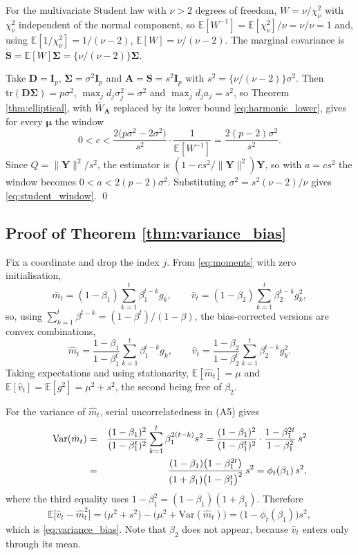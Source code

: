 \documentclass[a4paper,fleqn]{cas-dc}
\theoremstyle{plain}
\theoremstyle{definition}
\theoremstyle{remark}
\newcommand{\rev}[1]{#1}
\newcommand{\tr}{\mathrm{tr}}
\newcommand{\Var}{\mathrm{Var}}
\newcommand{\E}{\mathbb{E}}
\begin{document}
\begin{appendices}
For the multivariate Student law with $\nu>2$ degrees of freedom, $W=\nu/\chi^2_\nu$ with $\chi^2_\nu$ independent of the normal component, so $\E[W^{-1}]=\E[\chi^2_\nu]/\nu=\nu/\nu=1$ and, using $\E[1/\chi^2_\nu]=1/(\nu-2)$, $\E[W]=\nu/(\nu-2)$. The marginal covariance is $\bm S=\E[W]\bm\Sigma=\{\nu/(\nu-2)\}\bm\Sigma$.

Take $\bm D=\bm I_p$, $\bm\Sigma=\sigma^2\bm I_p$ and $\bm A=\bm S=s^2\bm I_p$ with $s^2=\{\nu/(\nu-2)\}\sigma^2$. Then $\tr(\bm D\bm\Sigma)=p\sigma^2$, $\max_jd_j\sigma^2_j=\sigma^2$ and $\max_jd_ja_j=s^2$, so \rev{Theorem \ref{thm:elliptical}, with $\bar W_{\bm A}$ replaced by its lower bound \eqref{eq:harmonic_lower}, gives for every $\bm\mu$ the window}
\begin{equation}
0<c<\frac{2\bigl(p\sigma^2-2\sigma^2\bigr)}{s^2}\cdot\frac{1}{\E[W^{-1}]}
=\frac{2(p-2)\sigma^2}{s^2} .
\end{equation}
Since $Q=\|\bm Y\|^2/s^2$, the estimator is $(1-cs^2/\|\bm Y\|^2)\bm Y$, so with $a=cs^2$ the window becomes $0<a<2(p-2)\sigma^2$. Substituting $\sigma^2=s^2(\nu-2)/\nu$ gives \eqref{eq:student_window}. \qed

\subsection*{Proof of Theorem \ref{thm:variance_bias}}

Fix a coordinate and drop the index $j$. From \eqref{eq:moments} with zero initialisation,
\begin{equation}
\bar m_t=(1-\beta_1)\sum_{k=1}^{t}\beta_1^{t-k}g_k,
\qquad
\bar v_t=(1-\beta_2)\sum_{k=1}^{t}\beta_2^{t-k}g^2_k ,
\end{equation}
so, using $\sum_{k=1}^{t}\beta^{t-k}=(1-\beta^{t})/(1-\beta)$, the bias-corrected versions are convex combinations,
\begin{equation}
\hat m_t=\frac{1-\beta_1}{1-\beta_1^{t}}\sum_{k=1}^{t}\beta_1^{t-k}g_k,
\qquad
\hat v_t=\frac{1-\beta_2}{1-\beta_2^{t}}\sum_{k=1}^{t}\beta_2^{t-k}g^2_k .
\end{equation}
Taking expectations and using stationarity, $\E[\hat m_t]=\mu$ and $\E[\hat v_t]=\E[g^2]=\mu^2+s^2$, the second being free of $\beta_2$.

For the variance of $\hat m_t$, serial uncorrelatedness in (A5) gives
\begin{eqnarray}
\Var(\hat m_t)
&=&
\frac{(1-\beta_1)^2}{(1-\beta_1^{t})^{2}}\sum_{k=1}^{t}\beta_1^{2(t-k)}s^2
=
\frac{(1-\beta_1)^2}{(1-\beta_1^{t})^{2}}\cdot\frac{1-\beta_1^{2t}}{1-\beta_1^{2}}\,s^2
\cr
&=&
\frac{(1-\beta_1)\bigl(1-\beta_1^{2t}\bigr)}{(1+\beta_1)\bigl(1-\beta_1^{t}\bigr)^{2}}\,s^2
=
\phi_t(\beta_1)\,s^2 ,
\end{eqnarray}
where the third equality uses $1-\beta_1^2=(1-\beta_1)(1+\beta_1)$. Therefore
\begin{equation}
\E\bigl[\hat v_t-\hat m^2_t\bigr]
=
\bigl(\mu^2+s^2\bigr)-\bigl(\mu^2+\Var(\hat m_t)\bigr)
=
\bigl(1-\phi_t(\beta_1)\bigr)s^2 ,
\end{equation}
which is \eqref{eq:variance_bias}. Note that $\beta_2$ does not appear, because $\hat v_t$ enters only through its mean.


\end{appendices}
\end{document}
